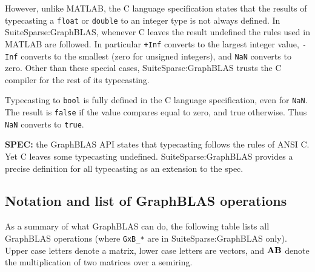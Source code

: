 \documentclass[12pt]{article}
\begin{document}
However, unlike MATLAB, the C language specification states that the results of
typecasting a \verb'float' or \verb'double' to an integer type is not always
defined.  In SuiteSparse:GraphBLAS, whenever C leaves the result undefined the
rules used in MATLAB are followed.  In particular \verb'+Inf' converts to the
largest integer value, \verb'-Inf' converts to the smallest (zero for unsigned
integers), and \verb'NaN' converts to zero.  Other than these special cases,
SuiteSparse:GraphBLAS trusts the C compiler for the rest of its typecasting.

Typecasting to \verb'bool' is fully defined in the C language specification,
even for \verb'NaN'.  The result is \verb'false' if the value compares equal to
zero, and true otherwise.  Thus \verb'NaN' converts to \verb'true'.

\begin{spec}
{\bf SPEC:} the GraphBLAS API states that typecasting follows the rules of ANSI
C.  Yet C leaves some typecasting undefined.  SuiteSparse:GraphBLAS provides a
precise definition for all typecasting as an extension to the spec.
\end{spec}

\subsection{Notation and list of GraphBLAS operations} %
\label{list}

As a summary of what GraphBLAS can do, the following table lists all GraphBLAS
operations (where \verb'GxB_*' are in SuiteSparse:GraphBLAS only).  Upper case
letters denote a matrix, lower case letters are vectors, and ${\bf AB}$
denote the multiplication of two matrices over a semiring.
\end{document}
